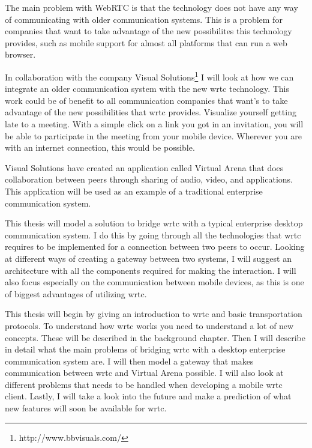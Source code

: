 The main problem with WebRTC is that the technology does not have any way of communicating with older communication systems. This is a problem for companies that want to take advantage of the new possibilites this technology provides, such as mobile support for almost all platforms that can run a web browser.

In collaboration with the company Visual Solutions\footnote{http://www.bbvisuals.com/} I will look at how we can integrate an older communication system with the new \gls{wrtc} technology. This work could be of benefit to all communication companies that want's to take advantage of the new possibilities that \gls{wrtc} provides. Visualize yourself getting late to a meeting. With a simple click on a link you got in an invitation, you will be able to participate in the meeting from your mobile device. Wherever you are with an internet connection, this would be possible.

Visual Solutions have created an application called Virtual Arena that does collaboration between peers through sharing of audio, video, and applications. This application will be used as an example of a traditional enterprise communication system.

This thesis will model a solution to bridge \gls{wrtc} with a typical enterprise desktop communication system. I do this by going through all the technologies that \gls{wrtc} requires to be implemented for a connection between two peers to occur. Looking at different ways of creating a gateway between two systems, I will suggest an architecture with all the components required for making the interaction. I will also focus especially on the communication between mobile devices, as this is one of biggest advantages of utilizing \gls{wrtc}.

This thesis will begin by giving an introduction to \gls{wrtc} and basic transportation protocols. To understand how \gls{wrtc} works you need to understand a lot of new concepts. These will be described in the background chapter. Then I will describe in detail what the main problems of bridging \gls{wrtc} with a desktop enterprise communication system are. I will then model a gateway that makes communication between \gls{wrtc} and Virtual Arena possible. I will also look at different problems that needs to be handled when developing a mobile \gls{wrtc} client. Lastly, I will take a look into the future and make a prediction of what new features will soon be available for \gls{wrtc}.